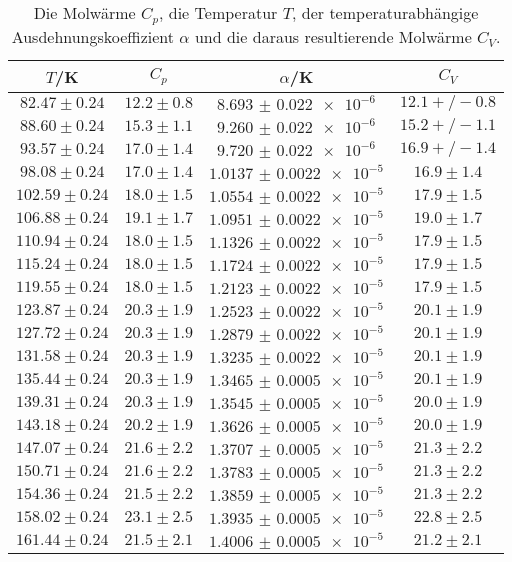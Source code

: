 \begin{table}
  \centering
  \caption{Die Molwärme $C_p$, die Temperatur $T$, der temperaturabhängige Ausdehnungskoeffizient $\alpha$ und die daraus resultierende Molwärme $C_V$.}
  \label{tab:tab2}
  \begin{tabular}{c c c c}
    \toprule
		$T$/K & $C_p$ & $\alpha$/K & $C_V$ \\
    \midrule
		$82.47\pm0.24$  & $12.2\pm0.8$ & $\num{8.693(22)e-6}$ & $12.1+/-0.8$ \\
		$88.60\pm0.24$  & $15.3\pm1.1$ & $\num{9.260(22)e-6}$ & $15.2+/-1.1$ \\
		$93.57\pm0.24$  & $17.0\pm1.4$ & $\num{9.720(22)e-6}$ & $16.9+/-1.4$ \\
		$98.08\pm0.24$  & $17.0\pm1.4$ & $\num{1.0137(22)e-5}$ & $16.9\pm1.4$ \\
		$102.59\pm0.24$ & $18.0\pm1.5$ & $\num{1.0554(22)e-5}$ & $17.9\pm1.5$ \\
		$106.88\pm0.24$ & $19.1\pm1.7$ & $\num{1.0951(22)e-5}$ & $19.0\pm1.7$ \\
		$110.94\pm0.24$ & $18.0\pm1.5$ & $\num{1.1326(22)e-5}$ & $17.9\pm1.5$ \\
		$115.24\pm0.24$ & $18.0\pm1.5$ & $\num{1.1724(22)e-5}$ & $17.9\pm1.5$ \\
		$119.55\pm0.24$ & $18.0\pm1.5$ & $\num{1.2123(22)e-5}$ & $17.9\pm1.5$ \\
		$123.87\pm0.24$ & $20.3\pm1.9$ & $\num{1.2523(22)e-5}$ & $20.1\pm1.9$ \\
		$127.72\pm0.24$ & $20.3\pm1.9$ & $\num{1.2879(22)e-5}$ & $20.1\pm1.9$ \\
		$131.58\pm0.24$ & $20.3\pm1.9$ & $\num{1.3235(22)e-5}$ & $20.1\pm1.9$ \\
		$135.44\pm0.24$ & $20.3\pm1.9$ & $\num{1.3465(5)e-5}$ & $20.1\pm1.9$ \\
		$139.31\pm0.24$ & $20.3\pm1.9$ & $\num{1.3545(5)e-5}$ & $20.0\pm1.9$ \\
		$143.18\pm0.24$ & $20.2\pm1.9$ & $\num{1.3626(5)e-5}$ & $20.0\pm1.9$ \\
		$147.07\pm0.24$ & $21.6\pm2.2$ & $\num{1.3707(5)e-5}$ & $21.3\pm2.2$ \\
		$150.71\pm0.24$ & $21.6\pm2.2$ & $\num{1.3783(5)e-5}$ & $21.3\pm2.2$ \\
		$154.36\pm0.24$ & $21.5\pm2.2$ & $\num{1.3859(5)e-5}$ & $21.3\pm2.2$ \\
		$158.02\pm0.24$ & $23.1\pm2.5$ & $\num{1.3935(5)e-5}$ & $22.8\pm2.5$ \\
		$161.44\pm0.24$ & $21.5\pm2.1$ & $\num{1.4006(5)e-5}$ & $21.2\pm2.1$ \\

\end{tabular}
\end{table}
